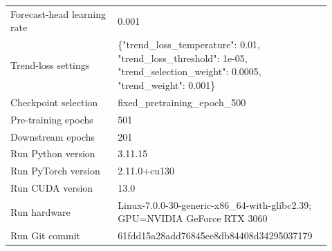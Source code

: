 \begin{table}[p]
\begin{tabular}{p{0.32\linewidth}p{0.60\linewidth}}
Forecast-head learning rate & 0.001 \\
Trend-loss settings & \{"trend\_loss\_temperature": 0.01, "trend\_loss\_threshold": 1e-05, "trend\_selection\_weight": 0.0005, "trend\_weight": 0.001\} \\
Checkpoint selection & fixed\_pretraining\_epoch\_500 \\
Pre-training epochs & 501 \\
Downstream epochs & 201 \\
Run Python version & 3.11.15 \\
Run PyTorch version & 2.11.0+cu130 \\
Run CUDA version & 13.0 \\
Run hardware & Linux-7.0.0-30-generic-x86\_64-with-glibc2.39; GPU=NVIDIA GeForce RTX 3060 \\
Run Git commit & 61fdd15a28add76845ee8db84408d34295037179 \\
\bottomrule
\end{tabular}
\end{table}

